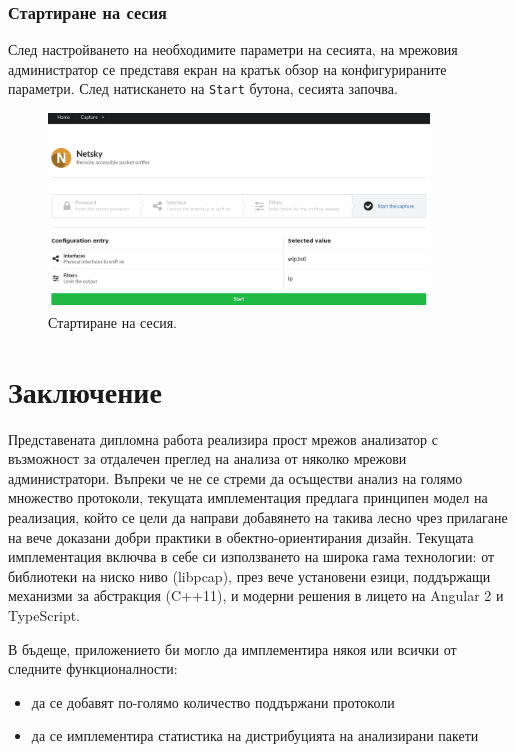 \documentclass[12pt,a4paper,oneside]{book}
\begin{document}
\subsection{Стартиране на сесия}

След настройването на необходимите параметри на сесията, на мрежовия
администратор се представя екран на кратък обзор на конфигурираните параметри.
След натискането на \texttt{Start} бутона, сесията започва.

\begin{figure}[h!]
  \centering
  \includegraphics[width=0.9\textwidth]{figures/screenshots/start.png}
  \caption{Стартиране на сесия.}
  \label{screenshots_start_fig}
\end{figure}

\chapter{Заключение}

Представената дипломна работа реализира прост мрежов анализатор с възможност
за отдалечен преглед на анализа от няколко мрежови администратори.
Въпреки че не се стреми да осъществи анализ на голямо множество протоколи,
текущата имплементация предлага принципен модел на реализация, който се
цели да направи добавянето на такива лесно чрез прилагане на вече доказани
добри практики в обектно-ориентирания дизайн. Текущата имплементация включва
в себе си използването на широка гама технологии: от библиотеки на ниско ниво (libpcap),
през вече установени езици, поддържащи механизми за абстракция (C++11),
и модерни решения в лицето на Angular 2 и TypeScript.

В бъдеще, приложението би могло да имплементира някоя или всички от следните
функционалности:

\begin{itemize}
  \item
  да се добавят по-голямо количество поддържани протоколи
\item
  да се имплементира статистика на дистрибуцията на анализирани пакети
\end{itemize}




\listoffigures
\end{document}
